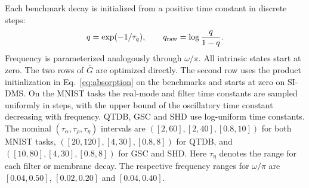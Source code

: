 \documentclass[letterpaper,journal]{IEEEtran}
\begin{document}
Each benchmark decay is initialized from a positive time constant in discrete steps:
\begin{equation}
q=\exp(-1/\tau_q),\qquad q_{\rm raw}=\log\frac{q}{1-q}.
\label{eq:decay_init}
\end{equation}
Frequency is parameterized analogously through $\omega/\pi$. All intrinsic states start at zero. The two rows of $\bar G$ are optimized directly. The second row uses the product initialization in Eq.~\eqref{eq:absorption} on the benchmarks and starts at zero on SI-DMS. On the MNIST tasks the real-mode and filter time constants are sampled uniformly in steps, with the upper bound of the oscillatory time constant decreasing with frequency. QTDB, GSC and SHD use log-uniform time constants. The nominal $(\tau_\alpha,\tau_\rho,\tau_\eta)$ intervals are $([2,60],[2,40],[0.8,10])$ for both MNIST tasks, $([20,120],[4,30],[0.8,8])$ for QTDB, and $([10,80],[4,30],[0.8,8])$ for GSC and SHD. Here $\tau_\eta$ denotes the range for each filter or membrane decay. The respective frequency ranges for $\omega/\pi$ are $[0.04,0.50]$, $[0.02,0.20]$ and $[0.04,0.40]$.
\end{document}
